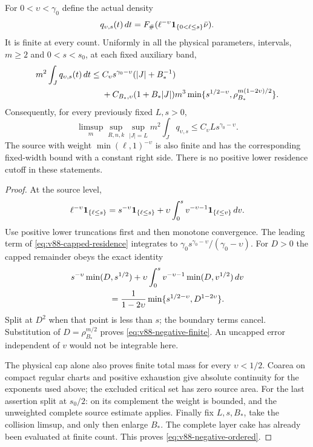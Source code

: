 \begin{theorem}
\label{thm:v88-negative-residence}
For $0<\upsilon<\gamma_0$ define the actual density
\[
 q_{\upsilon,s}(t)\,dt
 =F_\#(\ell^{-\upsilon}\mathbf1_{\{0<\ell\le s\}}\bar\nu).
\]
It is finite at every count. Uniformly in all the physical parameters,
intervals, $m\ge2$ and $0<s<s_0$, at each fixed auxiliary band,
\begin{align}
 m^2\int_Jq_{\upsilon,s}(t)\,dt
 \le{}&C_\upsilon s^{\gamma_0-\upsilon}(|J|+B_*^{-1})\notag\\
 &+C_{B_*,\upsilon}(1+B_*|J|)m^3
 \min\{s^{1/2-\upsilon},\rho_{B_*}^{m(1-2\upsilon)/2}\}.
                                      \label{eq:v88-negative-finite}
\end{align}
Consequently, for every previously fixed $L,s>0$,
\begin{equation}\label{eq:v88-negative-ordered}
 \limsup_m\sup_{R,n,k}\sup_{|J|=L}m^2\int_Jq_{\upsilon,s}
                               \le C_\upsilon Ls^{\gamma_0-\upsilon}.
\end{equation}
The source with weight $\min(\ell,1)^{-\upsilon}$ is also finite
and has the corresponding fixed-width bound with a constant right
side. There is no positive lower residence cutoff in these statements.
\end{theorem}
\begin{proof}
At the source level,
\[
 \ell^{-\upsilon}\mathbf1_{\{\ell\le s\}}
 =s^{-\upsilon}\mathbf1_{\{\ell\le s\}}
       +\upsilon\int_0^s v^{-\upsilon-1}\mathbf1_{\{\ell\le v\}}\,dv.
\]
Use positive lower truncations first and then monotone convergence.
The leading term of \eqref{eq:v88-capped-residence} integrates to
$\gamma_0s^{\gamma_0-\upsilon}/(\gamma_0-\upsilon)$.
For $D>0$ the capped remainder obeys the exact identity
\begin{align}
 &s^{-\upsilon}\min(D,s^{1/2})
   +\upsilon\int_0^s v^{-\upsilon-1}\min(D,v^{1/2})\,dv\notag\\
 &\hspace{16mm}=\frac1{1-2\upsilon}
                     \min\{s^{1/2-\upsilon},D^{1-2\upsilon}\}.
                                      \label{eq:v88-residence-layer-cake}
\end{align}
Split at $D^2$ when that point is less than $s$; the boundary terms
cancel. Substitution of $D=\rho_{B_*}^{m/2}$ proves
\eqref{eq:v88-negative-finite}. An uncapped error independent of
$v$ would not be integrable here.

The physical cap alone also proves finite total mass for every
$\upsilon<1/2$. Coarea on compact regular charts and positive
exhaustion give absolute continuity for the exponents used above;
the excluded critical set has zero source area. For the last
assertion split at $s_0/2$: on its complement the weight is bounded,
and the unweighted complete source estimate applies.
Finally fix $L,s,B_*$, take the collision limsup, and only then
enlarge $B_*$. The complete layer cake has already been evaluated
at finite count. This proves \eqref{eq:v88-negative-ordered}.
\end{proof}
